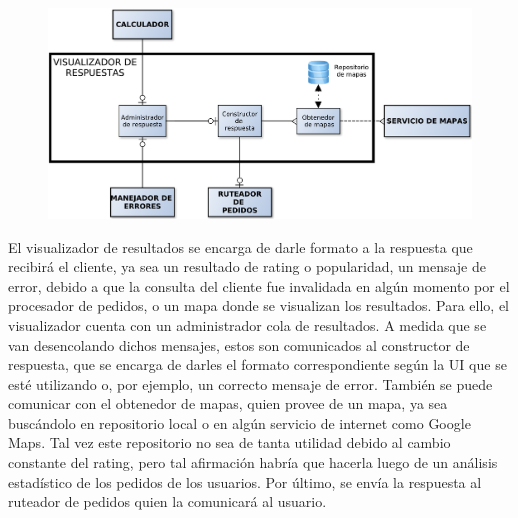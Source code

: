 \begin{figure}[H]
\centering
\includegraphics[width=\textwidth]{graph/visualizador.pdf}
\end{figure}

El visualizador de resultados se encarga de darle formato a la respuesta que recibirá el cliente, ya sea un resultado de rating o popularidad, un mensaje de error, debido a que la consulta del cliente fue invalidada en algún momento por el procesador de pedidos, o un mapa donde se visualizan los resultados. Para ello, el visualizador cuenta con un administrador cola de resultados. A medida que se van desencolando dichos mensajes, estos son comunicados al constructor de respuesta, que se encarga de darles el formato correspondiente según la UI que se esté utilizando o, por ejemplo, un correcto mensaje de error. También se puede comunicar con el obtenedor de mapas, quien provee de un mapa, ya sea buscándolo en repositorio local o en algún servicio de internet como Google Maps. Tal vez este repositorio no sea de tanta utilidad debido al cambio constante del rating, pero tal afirmación habría que hacerla luego de un análisis estadístico de los pedidos de los usuarios. Por último, se envía la respuesta al 
ruteador de pedidos quien la comunicará al usuario.
